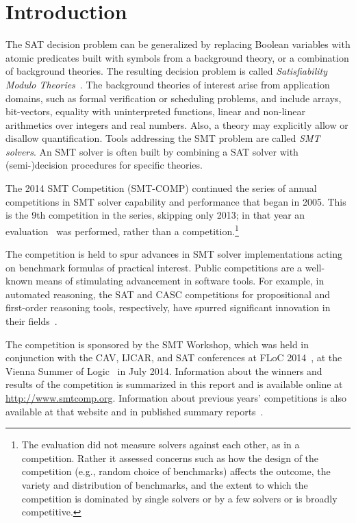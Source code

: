 \documentclass[twoside,11pt]{article}
\begin{document}
\section{Introduction}
\label{sec:intro}

The SAT decision problem can be generalized by replacing
Boolean variables with atomic predicates built with symbols from a
background theory, or a combination of background theories. The
resulting decision problem is called \emph{Satisfiability Modulo
  Theories}~\cite{DBLP:conf/jelia/Tinelli02}. The background theories of interest arise from
	application domains, such as formal verification or scheduling problems, and include arrays,
bit-vectors, equality with uninterpreted functions, linear and
non-linear arithmetics over integers and real numbers. Also, a theory
may explicitly allow or disallow quantification. Tools addressing the
SMT problem are called \emph{SMT solvers\/}. An SMT solver is often
built by combining a SAT solver with (semi-)decision procedures for
specific theories.

The 2014 SMT Competition (SMT-COMP) continued the series of annual competitions in SMT solver capability and performance that began in 2005. This is the 9th competition in the series, skipping only 2013; in that year an evaluation~\cite{it:2014-017} was performed, rather than a competition.\footnote{The evaluation did not measure solvers against each other, as in a competition. Rather it assessed concerns such as how the design of the competition (e.g., random choice of benchmarks) affects the outcome, the variety and distribution of benchmarks, and the extent to which the competition is dominated by single solvers or by a few solvers or is broadly competitive.}

The competition is held to spur advances in
SMT solver implementations acting on benchmark formulas of practical interest. Public competitions are
a well-known means of stimulating advancement in software tools. For example, in automated
reasoning, the SAT and CASC competitions for propositional and first-order reasoning tools, respectively,
have spurred significant innovation in their fields~\cite{satwebsite,jarvisalo2012international,leberre+03,PSS02}.

The competition is sponsored by the SMT Workshop, which was held in conjunction with the
CAV, IJCAR, and SAT conferences at FLoC 2014~\cite{FLoC2014}, at the Vienna Summer of Logic~\cite{VSL} in July 2014.
Information about the winners
and results of the competition is summarized in this report and is available online at \url{http://www.smtcomp.org}.  Information
about previous years' competitions is also available at that website and in published summary reports~\cite{springerlink:10.1007/s10817-012-9246-5,DBLP:conf/cade/CokGBD12,it:2014-017}.
\end{document}
